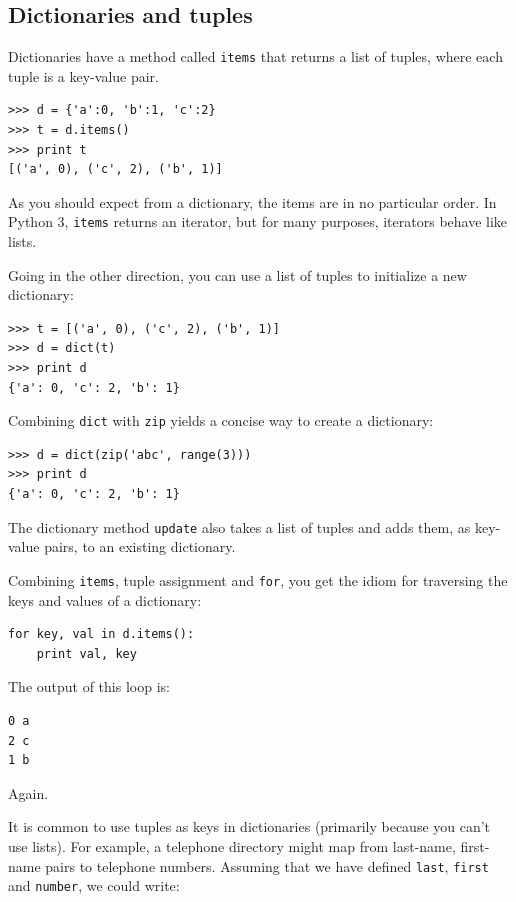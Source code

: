 \documentclass[10pt]{book}
\begin{document}
\begin{CJK}{UTF8}{gbsn}
\section{Dictionaries and tuples}
\label{dictuple}

Dictionaries have a method called {\tt items} that returns a list of
tuples, where each tuple is a key-value pair.

\begin{verbatim}
>>> d = {'a':0, 'b':1, 'c':2}
>>> t = d.items()
>>> print t
[('a', 0), ('c', 2), ('b', 1)]
\end{verbatim}
%
As you should expect from a dictionary, the items are in no
particular order.  In Python 3, {\tt items} returns an iterator,
but for many purposes, iterators behave like lists.

Going in the other direction, you can use a list of tuples to
initialize a new dictionary: 

\begin{verbatim}
>>> t = [('a', 0), ('c', 2), ('b', 1)]
>>> d = dict(t)
>>> print d
{'a': 0, 'c': 2, 'b': 1}
\end{verbatim}

Combining {\tt dict} with {\tt zip} yields a concise way
to create a dictionary:

\begin{verbatim}
>>> d = dict(zip('abc', range(3)))
>>> print d
{'a': 0, 'c': 2, 'b': 1}
\end{verbatim}
%
The dictionary method {\tt update} also takes a list of tuples
and adds them, as key-value pairs, to an existing dictionary.

Combining {\tt items}, tuple assignment and {\tt for}, you
get the idiom for traversing the keys and values of a dictionary:

\begin{verbatim}
for key, val in d.items():
    print val, key
\end{verbatim}
%
The output of this loop is:

\begin{verbatim}
0 a
2 c
1 b
\end{verbatim}
%
Again.

It is common to use tuples as keys in dictionaries (primarily because
you can't use lists).  For example, a telephone directory might map
from last-name, first-name pairs to telephone numbers.  Assuming
that we have defined {\tt last}, {\tt first} and {\tt number}, we
could write:


\end{CJK}
\end{document}
